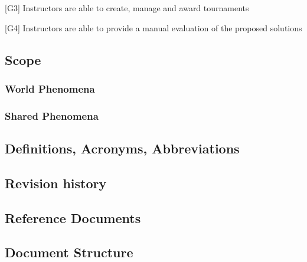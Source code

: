 [G3] Instructors are able to create, manage and award tournaments

[G4] Instructors are able to provide a manual evaluation of the proposed solutions


\subsection{Scope}

\subsubsection{World Phenomena}

\subsubsection{Shared Phenomena}

\subsection{Definitions, Acronyms, Abbreviations}

\subsection{Revision history}

\subsection{Reference Documents}

\subsection{Document Structure}
